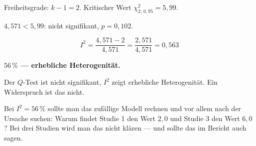 \begin{aufgabe}
Freiheitsgrade: $k-1 = 2$. Kritischer Wert $\chi^2_{2;\,0{,}95} = 5{,}99$.

$4{,}571 < 5{,}99$: nicht signifikant, $p = 0{,}102$.

\[ I^2 = \frac{4{,}571 - 2}{4{,}571} = \frac{2{,}571}{4{,}571} = 0{,}563 \]

\textbf{$56\,\%$ --- erhebliche Heterogenität.}

Der $Q$-Test ist nicht signifikant, $I^2$ zeigt erhebliche Heterogenität. Ein Widerspruch ist das nicht.

\begin{center}
\begin{minipage}{0.88\textwidth}
\end{minipage}
\end{center}

Bei $I^2 = 56\,\%$ sollte man das zufällige Modell rechnen und vor allem nach der Ursache suchen: Warum findet Studie 1 den Wert $2{,}0$ und Studie 3 den Wert $6{,}0$? Bei drei Studien wird man das nicht klären --- und sollte das im Bericht auch sagen.
\end{aufgabe}


